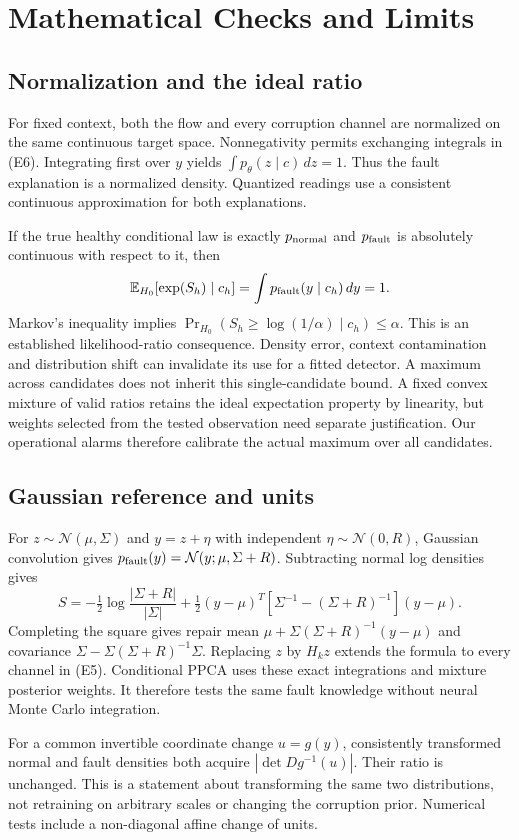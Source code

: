 \documentclass[conference]{IEEEtran}
\newcommand{\E}{\mathbb{E}}
\newcommand{\1}{\mathbf{1}}
\begin{document}
\section{Mathematical Checks and Limits}
\subsection{Normalization and the ideal ratio}
For fixed context, both the flow and every corruption channel are normalized on the same continuous target space. Nonnegativity permits exchanging integrals in (E6). Integrating first over $y$ yields $\int p_\theta(z\mid c)\,dz=1$. Thus the fault explanation is a normalized density. Quantized readings use a consistent continuous approximation for both explanations.

If the true healthy conditional law is exactly $p_{\rm normal}$ and $p_{\rm fault}$ is absolutely continuous with respect to it, then
\[
 \E_{H_0}[\exp(S_h)\mid c_h]=\int p_{\rm fault}(y\mid c_h)\,dy=1.
\]
Markov's inequality implies $\Pr_{H_0}(S_h\geq\log(1/\alpha)\mid c_h)\leq\alpha$. This is an established likelihood-ratio consequence. Density error, context contamination and distribution shift can invalidate its use for a fitted detector. A maximum across candidates does not inherit this single-candidate bound. A fixed convex mixture of valid ratios retains the ideal expectation property by linearity, but weights selected from the tested observation need separate justification. Our operational alarms therefore calibrate the actual maximum over all candidates.

\subsection{Gaussian reference and units}
For $z\sim\mathcal N(\mu,\Sigma)$ and $y=z+\eta$ with independent $\eta\sim\mathcal N(0,R)$, Gaussian convolution gives $p_{\rm fault}(y)=\mathcal N(y;\mu,\Sigma+R)$. Subtracting normal log densities gives
\[
 S=-\tfrac12\log\frac{|\Sigma+R|}{|\Sigma|}
 +\tfrac12(y-\mu)^T[\Sigma^{-1}-(\Sigma+R)^{-1}](y-\mu).
\]
Completing the square gives repair mean $\mu+\Sigma(\Sigma+R)^{-1}(y-\mu)$ and covariance $\Sigma-\Sigma(\Sigma+R)^{-1}\Sigma$. Replacing $z$ by $H_kz$ extends the formula to every channel in (E5). Conditional PPCA uses these exact integrations and mixture posterior weights. It therefore tests the same fault knowledge without neural Monte Carlo integration.

For a common invertible coordinate change $u=g(y)$, consistently transformed normal and fault densities both acquire $|\det Dg^{-1}(u)|$. Their ratio is unchanged. This is a statement about transforming the same two distributions, not retraining on arbitrary scales or changing the corruption prior. Numerical tests include a non-diagonal affine change of units.
\end{document}
